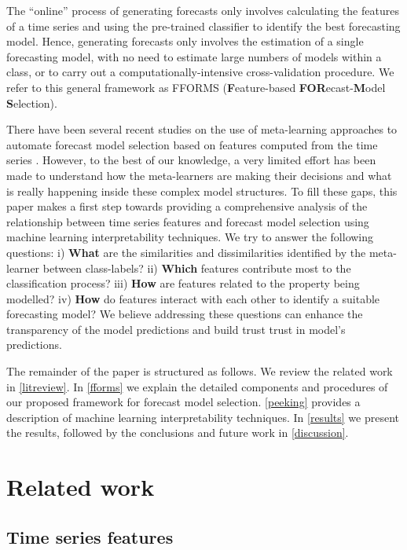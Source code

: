 \documentclass[11pt,a4paper,]{article}
\begin{document}
The ``online'' process of generating forecasts only involves calculating the features of a time series and using the pre-trained classifier to identify the best forecasting model. Hence, generating forecasts only involves the estimation of a single forecasting model, with no need to estimate large numbers of models within a class, or to carry out a computationally-intensive cross-validation procedure. We refer to this general framework as FFORMS (\textbf{F}eature-based \textbf{FOR}ecast-\textbf{M}odel \textbf{S}election).

There have been several recent studies on the use of meta-learning approaches to automate forecast model selection based on features computed from the time series \autocites{shah1997model}{prudencio2004meta}{lemke2010meta}{kuck2016meta}. However, to the best of our knowledge, a very limited effort has been made to understand how the meta-learners are making their decisions and what is really happening inside these complex model structures. To fill these gaps, this paper makes a first step towards providing a comprehensive analysis of the relationship between time series features and forecast model selection using machine learning interpretability techniques. We try to answer the following questions:
i) \textbf{What} are the similarities and dissimilarities identified by the meta-learner between class-labels?
ii) \textbf{Which} features contribute most to the classification process? iii) \textbf{How} are features related to the property being modelled?
iv) \textbf{How} do features interact with each other to identify a suitable forecasting model? We believe addressing these questions can enhance the transparency of the model predictions and build trust trust in model's predictions.

The remainder of the paper is structured as follows. We review the related work in \autoref{litreview}. In \autoref{fforms} we explain the detailed components and procedures of our proposed framework for forecast model selection. \autoref{peeking} provides a description of machine learning interpretability techniques. In \autoref{results} we present the results, followed by the conclusions and future work in \autoref{discussion}.

\hypertarget{litreview}{%
\section{Related work}\label{litreview}}

\hypertarget{time-series-features}{%
\subsection{Time series features}\label{time-series-features}}
\end{document}
